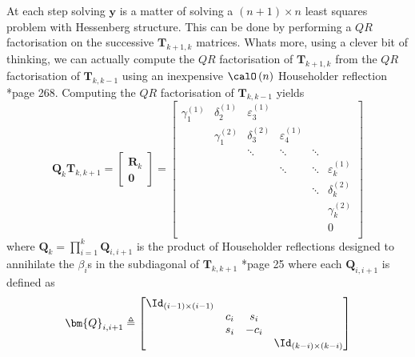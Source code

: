 At each step solving $\bm{y}$ is a matter of solving a $(n+1) \times n$ least squares problem with Hessenberg structure. This can be done by performing a $QR$ factorisation on the successive $\bm{T}_{k+1,k}$ matrices. Whats more, using a clever bit of thinking, we can actually compute the $QR$ factorisation of $\bm{T}_{k+1,k}$ from the $QR$ factorisation of $\bm{T}_{k,k-1}$ using an inexpensive $\calO \left( n \right)$ Householder reflection \cite{TrefethenLloydN.LloydNicholas1997Nla/}*{page 268}. Computing the $QR$ factorisation of $\bm{T}_{k,k-1}$ yields
\begin{equation}
    \bm{Q}_k \bm{T}_{k,k+1}
    =
    \begin{bmatrix}
        \bm{R}_k \\ \bm{0}
    \end{bmatrix}
    =
    \begin{bmatrix}
        \gamma_{1}^{(1)} & \delta_{2}^{(1)} & \varepsilon_{3}^{(1)} &                       &        &                       \\
                         & \gamma_{1}^{(2)} & \delta_{3}^{(2)}      & \varepsilon_{4}^{(1)} &        &                       \\
                         &                  & \ddots                & \ddots                & \ddots &                       \\
                         &                  &                       & \ddots                & \ddots & \varepsilon_{k}^{(1)} \\
                         &                  &                       &                       & \ddots & \delta_{k}^{(2)}      \\
                         &                  &                       &                       &        & \gamma_{k}^{(2)}      \\
                         &                  &                       &                       &        & 0                     \\
    \end{bmatrix}
\end{equation}
where $\bm{Q}_k = \prod_{i=1}^{k} \bm{Q}_{i,i+1}$ is the product of Householder reflections designed to annihilate the $\beta_i$s in the subdiagonal of $\bm{T}_{k,k+1}$ \cite{ChoiSou-ChengTerrya2007Imfs}*{page 25} where each $\bm{Q}_{i,i+1}$ is defined as
\begin{equation*}
    \bm{Q}_{i,i+1} \triangleq
    \begin{bmatrix}
        \Id_{(i-1) \times (i-1)} &       &        &                          \\
                                 & c_{i} & s_{i}  &                          \\
                                 & s_{i} & -c_{i} &                          \\
                                 &       &        & \Id_{(k-i) \times (k-i)}
    \end{bmatrix}
\end{equation*}
